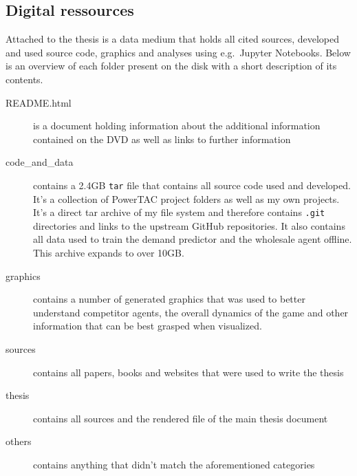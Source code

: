 \newpage
{}
\begin{appendices}
    \section{Digital ressources}
    Attached to the thesis is a data medium that holds all cited sources, developed and used source code, graphics and
    analyses using e.g.\ Jupyter Notebooks. Below is an overview of each folder present on the disk with a short description
    of its contents.

    \begin{description}
        \item[README.html] is a document holding information about the additional information contained on the DVD as well
            as links to further information
        \item[code\_and\_data] contains a 2.4GB \texttt{tar} file that contains all source code used and developed. It's a collection of \ac{PowerTAC}
            project folders as well as my own projects. It's a direct tar archive of my file system and therefore contains \texttt{.git}
            directories and links to the upstream GitHub repositories. It also contains all data used to train the demand predictor
            and the wholesale agent offline. This archive expands to over 10GB.
        \item[graphics] contains a number of generated graphics that was used to better understand competitor agents, the
            overall dynamics of the game and other information that can be best grasped when visualized.
        \item[sources] contains all papers, books and websites that were used to write the thesis
        \item[thesis] contains all sources and the rendered  file of the main thesis document
        \item[others] contains anything that didn't match the aforementioned categories
    \end{description}
\end{appendices}
